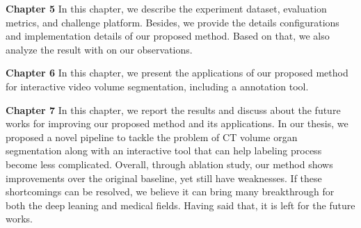 \textbf{Chapter 5}
In this chapter, we describe the experiment dataset, evaluation metrics, and challenge platform. Besides, we provide the details configurations and implementation details of our proposed method. Based on that, we also analyze the result with on our observations.

\textbf{Chapter 6}
In this chapter, we present the applications of our proposed method for interactive video volume segmentation, including a annotation tool. 

\textbf{Chapter 7}
In this chapter, we report the results and discuss about the future works for improving our proposed method and its applications. In our thesis, we proposed a novel pipeline to tackle the problem of CT volume organ segmentation along with an interactive tool that can help labeling process become less complicated. Overall, through ablation study, our method shows improvements over the original baseline, yet still have weaknesses. If these shortcomings can be resolved, we believe it can bring many breakthrough for both the deep leaning and medical fields. Having said that, it is left for the future works. 
